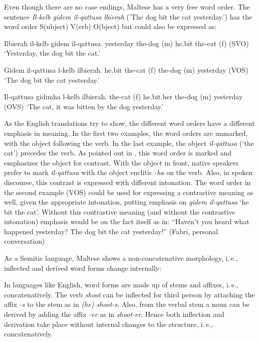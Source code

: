 \documentclass[]{../../metanetpaper}
\begin{document}
\begin{multicols}{2}

Even though there are no case endings, Maltese has a very free word order. The sentence \emph{Il-kelb gidem il-qattusa lbieraħ} ('The dog bit the cat yesterday.') has the word order S(ubject) V(erb) O(bject) but could also be expressed as:

\begin{examples}\label{WO_no_clitics}
\item
\gll Ilbieraħ il-kelb gidem il-qattusa.
yesterday	{the-dog (m)} he.bit	{the-cat (f)}
\gln (SVO)
\glt `Yesterday, the dog bit the cat.'
\glend

\item
\gll Gidem il-qattusa l-kelb ilbieraħ.
he.bit {the-cat (f)} {the-dog (m)} yesterday
\gln (VOS)
\glt `The dog bit the cat yesterday.'
\glend

\item
\gll Il-qattusa gidimha l-kelb ilbieraħ.
{the-cat (f)} he.bit.her {the-dog (m)} yesterday
\gln (OVS)
\glt `The cat, it was bitten by the dog yesterday.'
\glend
\end{examples}

As the English translations try to show, the different word orders have a different emphasis in meaning. In the first two examples, the word orders are unmarked, with the object following the verb. In the last example, the object \emph{il-qattusa} (`the cat') precedes the verb. As pointed out in \cite{Fabri:1993}, this word order is marked and emphasizes the object for contrast. With the object in front, native speakers prefer to mark \emph{il-qattusa} with the object enclitic -\emph{ha} on the verb. Also, in spoken discourse, this contrast is expressed with different intonation. The word order in the second example (VOS) could be used for expressing a contrastive meaning as well, given the appropriate intonation, putting emphasis on \emph{gidem il-qattusa} `he bit the cat'. Without this contrastive meaning (and without the contrastive intonation) emphasis would be on the fact itself as in: ``Haven’t you heard what happened yesterday? The dog bit the cat yesterday!'' (Fabri, personal conversation)


As a Semitic language, Maltese shows a non-concatenative morphology, i.\,e., inflected and derived word forms change internally:

In languages like English, word forms are made up of stems and affixes, i.\,e., concatenatively. The verb \emph{shoot} can be inflected for third person by attaching the affix \emph{-s} to the stem as in \emph{(he) shoot-s}. Also, from the verbal stem a noun can be derived by adding the affix \emph{-er} as in \emph{shoot-er}. Hence both inflection and derivation take place without internal changes to the structure, i.\,e., concatenatively. 


\end{multicols}
\end{document}
